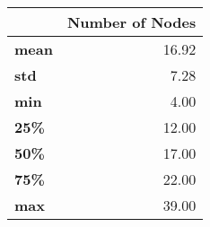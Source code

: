 \begin{tabular}{lr}
\toprule
{} &  Number of Nodes \\
\midrule
\textbf{mean} &            16.92 \\
\textbf{std } &             7.28 \\
\textbf{min } &             4.00 \\
\textbf{25\% } &            12.00 \\
\textbf{50\% } &            17.00 \\
\textbf{75\% } &            22.00 \\
\textbf{max } &            39.00 \\
\bottomrule
\end{tabular}
